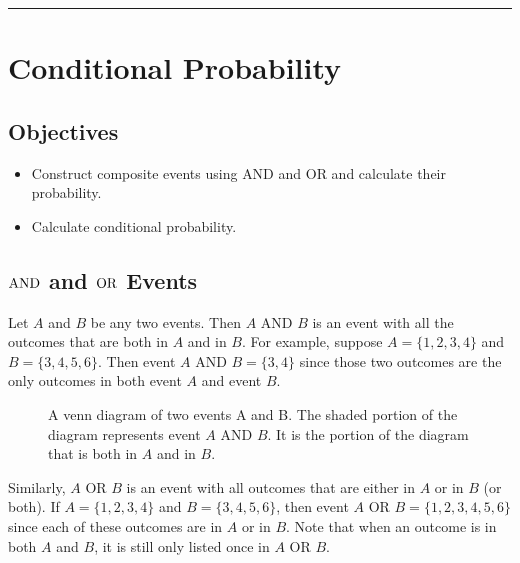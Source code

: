 \documentclass[letterpaper,10pt,english]{jupyterBook}
\begin{document}
\bigskip\hrule\bigskip


\sphinxstepscope


\section{Conditional Probability}
\label{\detokenize{Ch3 Probability/3.2 Conditional Probability:conditional-probability}}\label{\detokenize{Ch3 Probability/3.2 Conditional Probability::doc}}

\subsection{Objectives}
\label{\detokenize{Ch3 Probability/3.2 Conditional Probability:objectives}}\begin{itemize}
\item {} 
\sphinxAtStartPar
Construct composite events using \(\text{AND}\) and \(\text{OR}\) and calculate their probability.

\item {} 
\sphinxAtStartPar
Calculate conditional probability.

\end{itemize}


\subsection{\protect\(\text{AND}\protect\) and \protect\(\text{OR}\protect\) Events}
\label{\detokenize{Ch3 Probability/3.2 Conditional Probability:text-and-and-text-or-events}}
\sphinxAtStartPar
Let \(A\) and \(B\) be any two events. Then \(A \text{ AND } B\) is an event with all the outcomes that are both in \(A\) and in \(B\). For example, suppose \(A = \{1, 2, 3, 4\}\) and \(B = \{3, 4, 5, 6\}\). Then event \(A \text{ AND } B = \{3, 4\}\) since those two outcomes are the only outcomes in both event \(A\) and event \(B\).

\begin{figure}[htbp]
\centering
\capstart

\noindent{}
\caption{A venn diagram of two events A and B. The shaded portion of the diagram represents event \(A \text{ AND } B\). It is the portion of the diagram that is both in \(A\) and in \(B\).}\label{\detokenize{Ch3 Probability/3.2 Conditional Probability:vennand}}\end{figure}

\sphinxAtStartPar
Similarly, \(A \text{ OR } B\) is an event with all outcomes that are either in \(A\) or in \(B\) (or both). If \(A = \{1, 2, 3, 4\}\) and \(B = \{3, 4, 5, 6\}\), then event \(A \text{ OR } B = \{1, 2, 3, 4, 5, 6\}\) since each of these outcomes are in \(A\) or in \(B\). Note that when an outcome is in both \(A\) and \(B\), it is still only listed once in \(A \text{ OR } B\).
\end{document}
